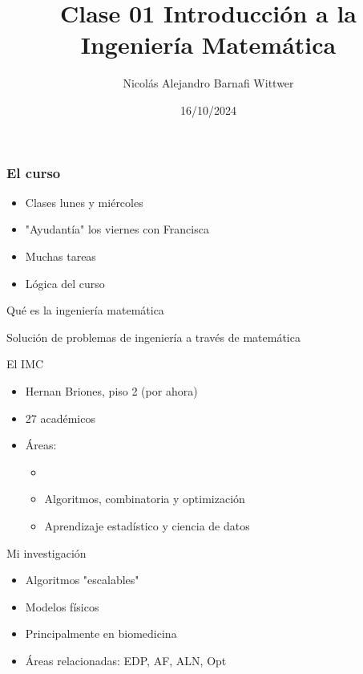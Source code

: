 \documentclass[14pt,aspectratio=169,xcolor=dvipsnames]{beamer}
\title[short title]{Clase 01 Introducción a la Ingeniería Matemática}
\subtitle{}
\author[NA Barnafi] {Nicolás Alejandro Barnafi Wittwer}
\institute[UC|CMM] 
{
    Pontificia Universidad Católica de Chile \\
    Centro de Modelamiento Matemático
}
\date{16/10/2024}
\begin{document}
\begin{frame}
    \maketitle
\end{frame}
\begin{frame}\frametitle{El curso}
    \begin{itemize}
        \item Clases lunes y miércoles
        \item "Ayudantía" los viernes con Francisca
        \item Muchas tareas
        \item Lógica del curso
    \end{itemize}
\end{frame}
\begin{frame}{Qué es la ingeniería matemática}
    \pause
    \begin{block}{}
        Solución de problemas de ingeniería a través de matemática
    \end{block}
\end{frame}
\begin{frame}{El IMC}
    \begin{itemize}
        \item Hernan Briones, piso 2 (por ahora)
        \item 27 académicos
        \item Áreas:
            \begin{itemize}
                \item {}
                \item Algoritmos, combinatoria y optimización
                \item Aprendizaje estadístico y ciencia de datos
            \end{itemize}
    \end{itemize}
\end{frame}
\begin{frame}{Mi investigación}
    \begin{itemize}
        \item Algoritmos "escalables"
        \item Modelos físicos
        \item Principalmente en biomedicina
        \item Áreas relacionadas: EDP, AF, ALN, Opt
    \end{itemize}
\end{frame}
\end{document}

